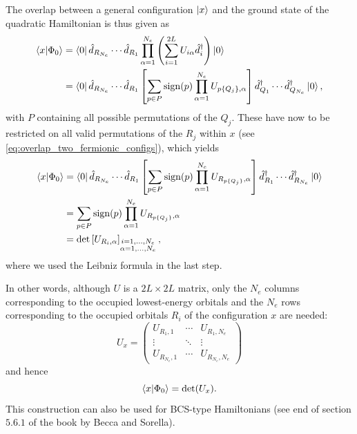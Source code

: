 \documentclass[../../main.tex]{subfiles}
\begin{document}
The overlap between a general configuration $\left\lvert x \right\rangle$ and the ground state of the quadratic Hamiltonian is thus given as
\begin{align}
    \left\langle x \middle| \Phi_0 \right\rangle
    &=
    \left\langle 0 \right\rvert
    \hat d_{R_{N_{e}}}
    \cdots
    \hat d_{R_1}
    \prod_{\alpha=1}^{N_{e}}
    \left(
        \sum_{i=1}^{2L}
        U_{i\alpha}\hat d_i^\dagger
    \right)
    \left\lvert 0 \right\rangle
    \nonumber\\
    &=
    \left\langle 0 \right\rvert
    \hat d_{R_{N_{e}}}
    \cdots
    \hat d_{R_1}
    \left[\sum_{p\in P}
    \operatorname{sign}(p)
    \prod_{\alpha=1}^{N_{e}}
    U_{p\{Q_j\},\alpha}\right] \hat d^\dagger_{Q_1}
    \cdots
    \hat d^\dagger_{Q_{N_{e}}} \left\lvert 0 \right\rangle,
    \label{eq:overlap-permutation-sum}
\end{align}
with $P$ containing all possible permutations of the $Q_j$. These have now to be restricted on all valid permutations of the $R_j$ within $x$ (see \cref{eq:overlap_two_fermionic_configs}), which yields
\begin{align}
    \left\langle x \middle| \Phi_0 \right\rangle
    &= \left\langle 0 \right\rvert \hat d_{R_{N_{e}}} \cdots \hat d_{R_1}
    \left[\sum_{p\in P}
    \operatorname{sign}(p)
    \prod_{\alpha=1}^{N_{e}}
    U_{R_{p\{Q_j\}},\alpha}\right] \hat d^\dagger_{R_1}
    \cdots
    \hat d^\dagger_{R_{N_{e}}} \left\lvert 0 \right\rangle \label{eq:determinant-describes-ground-state-entry-point-jwm} \\
    &= \sum_{p\in P}
    \operatorname{sign}(p)
    \prod_{\alpha=1}^{N_{e}}
    U_{R_{p\{Q_j\}},\alpha}  \\
    &= \det\left[
        U_{R_i,\alpha}
    \right]_{
        \substack{
            i=1,\ldots,N_{e}\\
            \alpha=1,\ldots,N_{e}
        }
    },
    \label{eq:slater-determinant-overlap}
\end{align}
where we used the Leibniz formula in the last step.

In other words, although $U$ is a $2L\times 2L$ matrix, only the
$N_{e}$ columns corresponding to the occupied lowest-energy
orbitals and the $N_{e}$ rows corresponding to the occupied
orbitals $R_i$ of the configuration $x$ are needed:
\begin{equation}
    U_x
    =
    \begin{pmatrix}
        U_{R_1,1}  & \cdots & U_{R_1,N_{e}} \\
        \vdots     & \ddots & \vdots \\
        U_{R_{N_{e}},1} & \cdots & U_{R_{N_{e}},N_{e}}
    \end{pmatrix}
\end{equation}
and hence
\begin{equation}
    \left\langle x \middle| \Phi_0 \right\rangle = \det(U_x).
\end{equation}
This construction can also be used for BCS-type Hamiltonians (see end of section $5.6.1$ of the book by Becca and Sorella).
\end{document}
